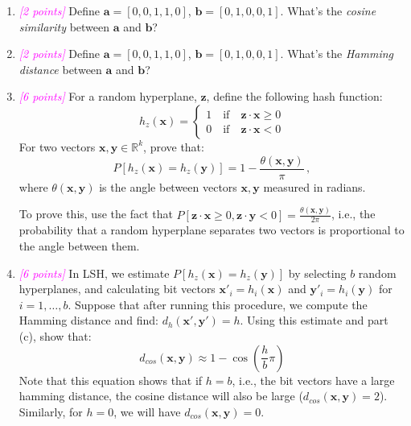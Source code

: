 \documentclass{exam}
\newcommand{\R}{\mathbb{R}} %
\newcommand{\xv}{\mathbf{x}}
\newcommand{\av}{\mathbf{a}}
\newcommand{\bv}{\mathbf{b}}
\newcommand{\yv}{\mathbf{y}}
\newcommand{\zv}{\mathbf{z}}
\newcommand{\grade}[1]{\small\textcolor{magenta}{\emph{[#1 points]}} \normalsize}
\newcommand{\sol}[1]{\ifshowsolutions{\leavevmode{\color{blue}Solution: #1}}\fi}
\newif\ifshowsolutions
\begin{document}
\begin{enumerate}[label=(\alph*)]
    \item\grade{2} Define $\av = [0,0,1,1,0]$, $\bv = [0,1,0,0,1]$. What's the \textit{cosine similarity} between $\av$ and $\bv$?
    
    \sol{$s_{cos}(\av,\bv) = 0$}
    
    \vspace{5em}
    \item\grade{2} Define $\av = [0,0,1,1,0]$, $\bv = [0,1,0,0,1]$. What's the \textit{Hamming distance} between $\av$ and $\bv$?
    
    \sol{$d_h(\av,\bv) = 4$}
    
    \vspace{1em}
    
    
    \newpage
    \item \grade{6} For a random hyperplane, $\zv$, define the following hash function: 
    $$
h_{z}(\xv) =
\begin{cases}
1 \quad \text{if} \quad \zv \cdot \xv \ge 0  \\
0 \quad \text{if} \quad \zv \cdot \xv < 0
\end{cases}
$$
For two vectors $\xv,\yv \in \R^k$, prove that:
$$P[h_z(\xv) = h_z(\yv)] = 1 - \frac{\theta(\xv,\yv)}{\pi} \, ,$$
where $\theta(\xv,\yv)$ is the angle between vectors $\xv, \yv$ measured in radians. 

To prove this, use the fact that $P[\zv \cdot \xv \ge 0, \zv \cdot \yv < 0 ] = \frac{\theta(\xv,\yv)}{2\pi}$, i.e., the probability that a random hyperplane separates two vectors is proportional to the angle between them. 

\sol{
\begin{align*}
P[h_z(\xv) = h_z(\yv)] & = 1 - P[h_z(\xv) \neq h_z(\yv)] \\
& = 1 - 2 P[\zv \cdot \xv \ge 0, \zv \cdot \yv < 0] \\
& = 1 - 2 \frac{\theta(\xv,\yv)}{2 \pi} \\
& = 1 - \frac{\theta(\xv,\yv)}{\pi}
\end{align*}
}

\newpage
\item \grade{6} In LSH, we estimate $P[h_z(\xv)=h_z(\yv)]$ by selecting $b$ random hyperplanes, and calculating bit vectors $\xv'_i = h_i(\xv)$ and $\yv'_i = h_i(\yv)$ for $i=1,\dots,b$. Suppose that after running this procedure, we compute the Hamming distance and find: $d_h(\xv',\yv')=h$. Using this estimate and part (c), show that:
$$ d_{cos}(\xv,\yv) \approx 1 - \cos\left(\frac{h}{b} \pi\right)$$
Note that this equation shows that if $h=b$, i.e., the bit vectors have a large hamming distance, the cosine distance will also be large ($d_{cos}(\xv,\yv) = 2$). Similarly, for $h=0$, we will have $d_{cos}(\xv,\yv) = 0$.


\end{enumerate}
\end{document}
